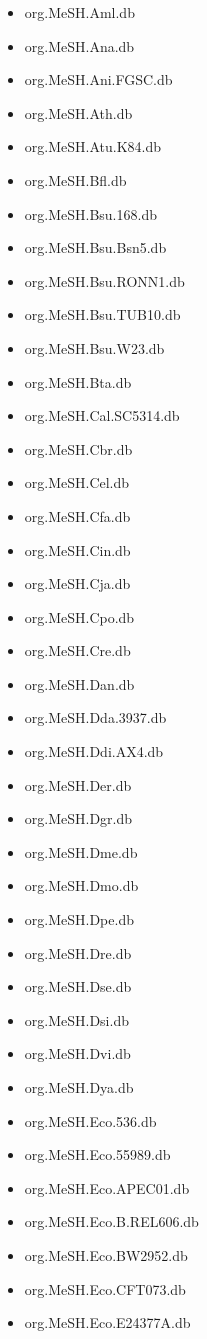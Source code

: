 \documentclass[margin,line,10pt]{res}
\newenvironment{list1}{
  \begin{list}{\ding{113}}{%
      \setlength{\itemsep}{0in}
      \setlength{\parsep}{0in} \setlength{\parskip}{0in}
      \setlength{\topsep}{0in} \setlength{\partopsep}{0in} 
      \setlength{\leftmargin}{0.17in}}}{\end{list}}
\begin{document}
\begin{resume}
\begin{list1}
\begin{multicols}{2}
\begin{itemize}
\item org.MeSH.Aml.db
\item org.MeSH.Ana.db
\item org.MeSH.Ani.FGSC.db
\item org.MeSH.Ath.db
\item org.MeSH.Atu.K84.db
\item org.MeSH.Bfl.db
\item org.MeSH.Bsu.168.db
\item org.MeSH.Bsu.Bsn5.db 
\item org.MeSH.Bsu.RONN1.db
\item org.MeSH.Bsu.TUB10.db
\item org.MeSH.Bsu.W23.db  
\item org.MeSH.Bta.db 
\item org.MeSH.Cal.SC5314.db
\item org.MeSH.Cbr.db 
\item org.MeSH.Cel.db
\item org.MeSH.Cfa.db
\item org.MeSH.Cin.db
\item org.MeSH.Cja.db
\item org.MeSH.Cpo.db
\item org.MeSH.Cre.db  
\item org.MeSH.Dan.db
\item org.MeSH.Dda.3937.db
\item org.MeSH.Ddi.AX4.db
\item org.MeSH.Der.db 
\item org.MeSH.Dgr.db 
\item org.MeSH.Dme.db 
\item org.MeSH.Dmo.db 
\item org.MeSH.Dpe.db
\item org.MeSH.Dre.db
\item org.MeSH.Dse.db
\item org.MeSH.Dsi.db
\item org.MeSH.Dvi.db  
\item org.MeSH.Dya.db
\item org.MeSH.Eco.536.db    
\item org.MeSH.Eco.55989.db
\item org.MeSH.Eco.APEC01.db 
\item org.MeSH.Eco.B.REL606.db
\item org.MeSH.Eco.BW2952.db 
\item org.MeSH.Eco.CFT073.db
\item org.MeSH.Eco.E24377A.db   

\end{itemize}
\end{multicols}
\end{list1}
\end{resume}
\end{document}
